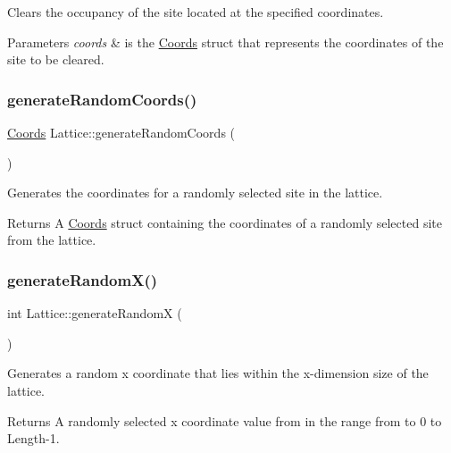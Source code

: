 Clears the occupancy of the site located at the specified coordinates. 


\begin{DoxyParams}{Parameters}
{\em coords} & is the \hyperlink{struct_coords}{Coords} struct that represents the coordinates of the site to be cleared. \\
\hline
\end{DoxyParams}
\mbox{\label{class_lattice_a9fbb3c8bc23999ff685b6837beb62606}} 
\subsubsection{\texorpdfstring{generate\+Random\+Coords()}{generateRandomCoords()}}
{\footnotesize\ttfamily \hyperlink{struct_coords}{Coords} Lattice\+::generate\+Random\+Coords (\begin{DoxyParamCaption}{ }\end{DoxyParamCaption})}



Generates the coordinates for a randomly selected site in the lattice. 

\begin{DoxyReturn}{Returns}
A \hyperlink{struct_coords}{Coords} struct containing the coordinates of a randomly selected site from the lattice. 
\end{DoxyReturn}
\mbox{\label{class_lattice_ab78435e50e3bf9f376c04fc305785bb4}} 
\subsubsection{\texorpdfstring{generate\+Random\+X()}{generateRandomX()}}
{\footnotesize\ttfamily int Lattice\+::generate\+RandomX (\begin{DoxyParamCaption}{ }\end{DoxyParamCaption})}



Generates a random x coordinate that lies within the x-\/dimension size of the lattice. 

\begin{DoxyReturn}{Returns}
A randomly selected x coordinate value from in the range from to 0 to Length-\/1. 
\end{DoxyReturn}
\mbox{\label{class_lattice_a180a9d79a40b1a0a092c8ab489569700}} 
